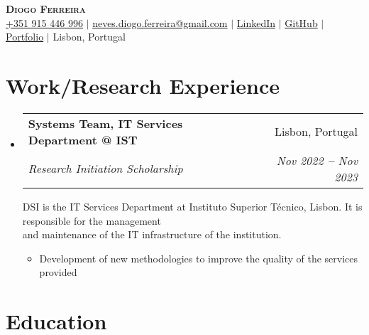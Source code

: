 \documentclass[letterpaper,11pt]{article}
\makeatletter
\newcommand{\resumeItem}[1]{
  \item\small{
    {#1 \vspace{-2pt}}
  }
}
\newcommand{\resumeSubheading}[4]{
  \vspace{-2pt}\item
    \begin{tabular*}{0.97\textwidth}[t]{l@{\extracolsep{\fill}}r}
      \textbf{#1} & #2 \\
      \textit{\small#3} & \textit{\small #4} \\
    \end{tabular*}\vspace{-7pt}
}
\newcommand{\resumeSubHeadingListStart}{\begin{itemize}[leftmargin=0.15in, label={}]}
\newcommand{\resumeSubHeadingListEnd}{\end{itemize}}
\newcommand{\resumeItemListStart}{\begin{itemize}}
\newcommand{\resumeItemListEnd}{\end{itemize}\vspace{-5pt}}
\makeatother
\begin{document}

\begin{center}
  \textbf{\Huge \scshape Diogo Ferreira} \\ \vspace{5pt}
  \small
  \faMobile \hspace{.5pt} \href{tel:+351915446996}{+351 915 446 996}
  $|$
  \faAt \hspace{.5pt} \href{mailto:neves.diogo.ferreira@gmail.com}{neves.diogo.ferreira@gmail.com}
  $|$
  \faLinkedinSquare \hspace{.5pt} \href{https://www.linkedin.com/in/neves-diogo}{LinkedIn}
  $|$
  \faGithub \hspace{.5pt} \href{https://github.com/neves-nvs}{GitHub}
  $|$
  \faGlobe \hspace{.5pt} \href{https://neves-ferreira.com}{Portfolio}
  $|$
  \faMapMarker \hspace{.5pt} Lisbon, Portugal
\end{center}


\section{Work/Research Experience}

\vspace{3pt}

\resumeSubHeadingListStart

\resumeSubheading
{Systems Team, IT Services Department @ IST}{Lisbon, Portugal}
{Research Initiation Scholarship}{Nov 2022 \textbf{--} Nov 2023}

\vspace{9pt}

\small DSI is the IT Services Department at Instituto Superior Técnico, Lisbon. It is responsible for the management \\
and maintenance of the IT infrastructure of the institution.

\resumeItemListStart
\resumeItem{Development of new methodologies to improve the quality of the services provided}
\resumeItemListEnd

\resumeSubHeadingListEnd


\section{Education}
\end{document}
